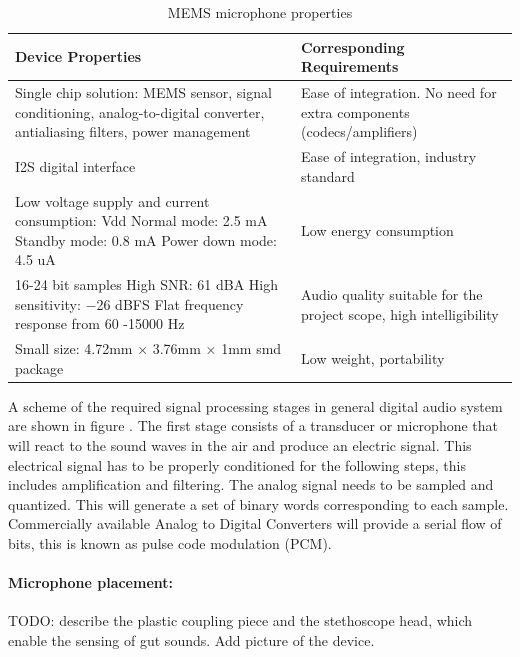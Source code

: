 \begin{table}
\centering
\begin{tabular}{|m{}|m{}|}
\hline 
	\textbf{Device Properties} &
	\textbf{Corresponding Requirements}  \\ 
\hline
	Single chip solution: MEMS sensor, signal conditioning, analog-to-digital converter, antialiasing filters, power management
	&
	Ease of integration. No need for extra components (codecs/amplifiers)\\ 
\hline 
	I2S digital interface 
	&
	Ease of integration, industry standard \\
\hline
	Low voltage supply and current consumption: \newline
	3.3 Vdd \newline
	Normal mode: 2.5 mA \newline
	Standby mode: 0.8 mA \newline
	Power down mode: 4.5 uA
	&
	Low energy consumption \\
\hline
	16-24 bit samples \newline
	High SNR: 61 dBA \newline
	High sensitivity: −26 dBFS \newline
	Flat frequency response from 60 -15000 Hz
	&
	Audio quality suitable for the project scope, high intelligibility \\
\hline
	Small size: 4.72mm × 3.76mm × 1mm smd package 
	&
	Low weight, portability
\\\hline	
\end{tabular} 
\caption{MEMS microphone properties}
\label{tab:microphone_properties}
\end{table}

A scheme of the required signal processing stages in general digital audio system are shown in figure .
The first stage consists of a transducer or microphone that will react to the sound waves in the air and produce an electric signal. This electrical signal has to be properly conditioned for the following steps, this includes amplification and filtering. The analog signal needs to be sampled and quantized. This will generate a set of binary words corresponding to each sample. Commercially available Analog to Digital Converters will provide a serial flow of bits, this is known as pulse code modulation (PCM).

\paragraph*{Microphone placement:} TODO: describe the plastic coupling piece and the stethoscope head, which enable the sensing of gut sounds. Add picture of the device.

